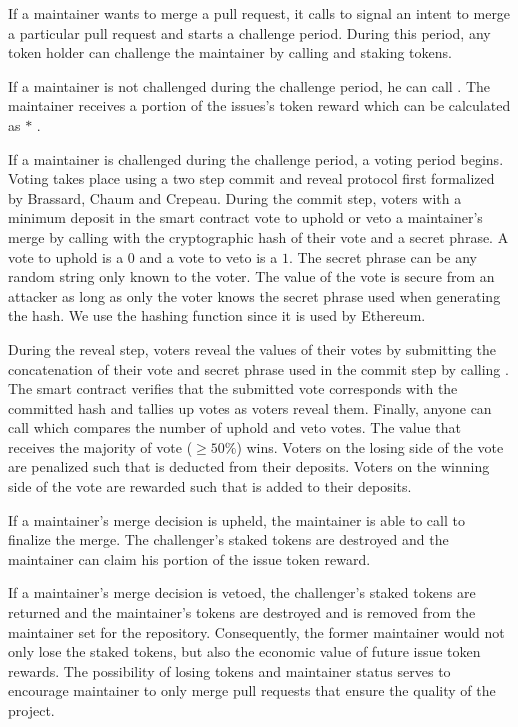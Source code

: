 If a maintainer wants to merge a pull request, it calls
 to signal an intent to merge a particular pull
request and starts a challenge period. During this period, any token holder can
challenge the maintainer by calling  and staking
 tokens.

If a maintainer is not challenged during the challenge period, he can call
. The maintainer receives a portion of the
issues's token reward which can be calculated as  $*$ .

If a maintainer is challenged during the challenge period, a voting
period begins. Voting takes place using a two step commit and reveal protocol
first formalized by Brassard, Chaum and Crepeau\cite{proofsofknowledge}. During
the commit step, voters with a minimum  deposit in the
smart contract vote to uphold or veto a maintainer's merge by calling
 with the cryptographic hash of their vote and a secret
phrase. A vote to uphold is a $0$ and a vote to veto is a $1$. The secret phrase
can be any random string only known to the voter. The value of the vote is
secure from an attacker as long as only the voter knows the secret phrase used
when generating the hash. We use the  hashing function since it is used by Ethereum.

During the reveal step, voters reveal the values of their votes by submitting
the concatenation of their vote and secret phrase used in the commit step by
calling . The smart contract verifies that the
submitted vote corresponds with the committed hash and tallies up votes as
voters reveal them. Finally, anyone can call  which
compares the number of uphold and veto votes. The value that receives the
majority of vote ($\geq 50\%$) wins. Voters on the losing side of the vote are
penalized such that  is deducted from their
deposits. Voters on the winning side of the vote are rewarded such that
 is added to their deposits.

If a maintainer's merge decision is upheld, the maintainer is able to call
 to finalize the merge. The challenger's
 staked tokens are destroyed and the maintainer can
claim his portion of the issue token reward.

If a maintainer's merge decision is vetoed, the challenger's staked tokens are
returned and the maintainer's  tokens are destroyed and is removed from the maintainer set for the
repository. Consequently, the former maintainer would not only lose the staked
tokens, but also the economic value of future issue token rewards. The
possibility of losing tokens and maintainer status serves to encourage
maintainer to only merge pull requests that ensure the quality of the project.

